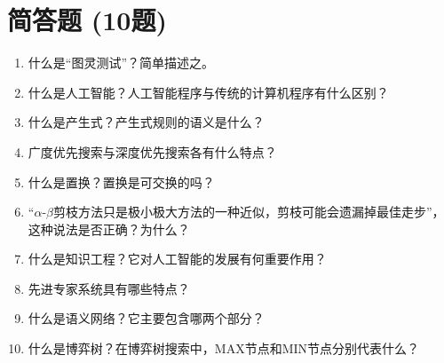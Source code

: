 \section{简答题 (10题)}

\begin{enumerate}[leftmargin=2em,itemsep=1pt]
\item 什么是“图灵测试”？简单描述之。
\item 什么是人工智能？人工智能程序与传统的计算机程序有什么区别？
\item 什么是产生式？产生式规则的语义是什么？
\item 广度优先搜索与深度优先搜索各有什么特点？
\item 什么是置换？置换是可交换的吗？
\item “$\alpha$-$\beta$剪枝方法只是极小极大方法的一种近似，剪枝可能会遗漏掉最佳走步”，这种说法是否正确？为什么？
\item 什么是知识工程？它对人工智能的发展有何重要作用？
\item 先进专家系统具有哪些特点？
\item 什么是语义网络？它主要包含哪两个部分？
\item 什么是博弈树？在博弈树搜索中，MAX节点和MIN节点分别代表什么？
\end{enumerate}

